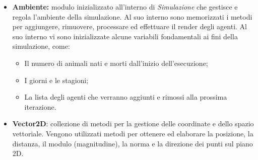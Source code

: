 \documentclass[11pt]{article}
\begin{document}
\begin{itemize}
\begin{itemize}
    \end{itemize}
    
    \item \textbf{Ambiente:} modulo inizializzato all'interno di \textit{Simulazione} che gestisce e regola l'ambiente della simulazione. Al suo interno sono memorizzati i metodi per aggiungere, rimuovere, processare ed effettuare il render degli agenti. Al suo interno vi sono inizializzate alcune variabili fondamentali ai fini della simulazione, come:
    \begin{itemize}
\item  Il numero di animali nati e morti dall’inizio dell’esecuzione;
\item I giorni e le stagioni;
\item La lista degli agenti che verranno aggiunti e rimossi alla prossima iterazione.
\end{itemize}

    \item \textbf{Vector2D}: collezione di metodi per la gestione delle coordinate e dello spazio vettoriale. Vengono utilizzati metodi per ottenere ed elaborare la posizione, la distanza, il modulo (magnitudine), la norma e la direzione dei punti sul piano 2D.
    

\end{itemize}
\end{document}
